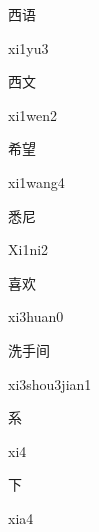 \begin{verbete}[xi1yu3]{西语}
\begin{pronuncia}{xi1yu3}
\end{pronuncia}
\end{verbete}

\begin{verbete}[xi1wen2]{西文}
\begin{pronuncia}{xi1wen2}
\end{pronuncia}
\end{verbete}

\begin{verbete}[xi1wang4]{希望}
\begin{pronuncia}{xi1wang4}
\end{pronuncia}
\end{verbete}

\begin{verbete}[Xi1ni2]{悉尼}
\begin{pronuncia}{Xi1ni2}
\end{pronuncia}
\end{verbete}

\begin{verbete}[xi3huan0]{喜欢}
\begin{pronuncia}{xi3huan0}
\end{pronuncia}
\end{verbete}

\begin{verbete}{洗手间}
\begin{pronuncia}{xi3shou3jian1}
\end{pronuncia}
\end{verbete}

\begin{verbete}[xi4]{系}
\begin{pronuncia}{xi4}
\end{pronuncia}
\end{verbete}

\begin{verbete}[xia4]{下}
\begin{pronuncia}{xia4}
\end{pronuncia}
\end{verbete}

